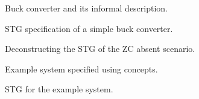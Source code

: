 \documentclass[british, journal]{IEEEtran}
\begin{document}
	
\begin{figure}[H]
	\begin{centering}
		\par
		\par
	\end{centering}
	\protect\caption{\label{fig:buck}Buck converter and its informal description.}
\end{figure}

\begin{figure}[H]
	\begin{centering}
		\par
				\protect\caption{\label{fig:Monolithic-buck}STG specification of a simple buck converter.}
		\par\end{centering}
\end{figure}

\begin{figure}[H]
	\begin{centering}
		\par
				\protect\caption{\label{fig:stg-breakdown}Deconstructing the STG of the ZC absent scenario.}
		\par\end{centering}
\end{figure}

\begin{figure}[H]
	\begin{centering}
		\par\end{centering}
		\protect\caption{\label{fig:cElement-concepts}Example system specified using concepts.}
\end{figure}

\begin{figure}[H]
	\begin{centering}
		\par\end{centering}
		\protect\caption{\label{fig:cElement STG composition}STG for the example system.}
\end{figure}
\end{document}
